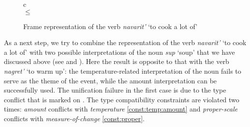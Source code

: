 \begin{figure}
\begin{tabular}{c}
\\
 $\leq$ \\
\end{tabular}
\caption{Frame representation of the verb \textit{navarit'} `to cook a lot of' \label{frame:navarit}}
\end{figure}

As a next step, we try to combine the representation of the verb \textit{navarit'} `to cook a lot of' with two possible interpretations of the noun \textit{sup} `soup' that we have discussed above (see  and ). Here the result is opposite to that with the verb \textit{nagret'} `to warm up': the temperature-related interpretation of the noun fails to serve as the theme of the event, while the amount interpretation can be successfully used. The unification failure in the first case is due to the type conflict that is marked on . The type compatibility constraints are violated two times: \textit{amount} conflicts with \textit{temperature} \ref{const:temp:amount} and \textit{proper-scale} conflicts with \textit{measure-of-change} \ref{const:proper}.


